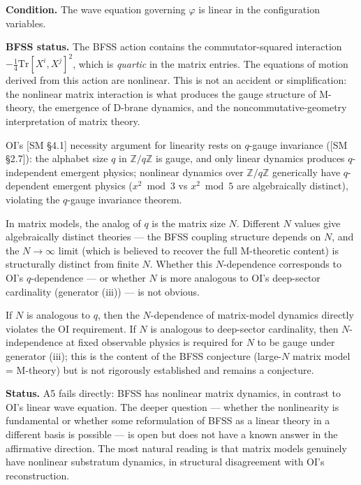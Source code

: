 \documentclass[
]{article}
\begin{document}
\textbf{Condition.} The wave equation governing \(\varphi\) is linear in
the configuration variables.

\textbf{BFSS status.} The BFSS action contains the commutator-squared
interaction \(-\frac{1}{4}\text{Tr}[X^i, X^j]^2\), which is
\emph{quartic} in the matrix entries. The equations of motion derived
from this action are nonlinear. This is not an accident or
simplification: the nonlinear matrix interaction is what produces the
gauge structure of M-theory, the emergence of D-brane dynamics, and the
noncommutative-geometry interpretation of matrix theory.

OI's {[}SM §4.1{]} necessity argument for linearity rests on \(q\)-gauge
invariance ({[}SM §2.7{]}): the alphabet size \(q\) in
\(\mathbb{Z}/q\mathbb{Z}\) is gauge, and only linear dynamics produces
\(q\)-independent emergent physics; nonlinear dynamics over
\(\mathbb{Z}/q\mathbb{Z}\) generically have \(q\)-dependent emergent
physics (\(x^2 \bmod 3\) vs \(x^2 \bmod 5\) are algebraically distinct),
violating the \(q\)-gauge invariance theorem.

In matrix models, the analog of \(q\) is the matrix size \(N\).
Different \(N\) values give algebraically distinct theories --- the BFSS
coupling structure depends on \(N\), and the \(N \to \infty\) limit
(which is believed to recover the full M-theoretic content) is
structurally distinct from finite \(N\). Whether this \(N\)-dependence
corresponds to OI's \(q\)-dependence --- or whether \(N\) is more
analogous to OI's deep-sector cardinality (generator (iii)) --- is not
obvious.

If \(N\) is analogous to \(q\), then the \(N\)-dependence of
matrix-model dynamics directly violates the OI requirement. If \(N\) is
analogous to deep-sector cardinality, then \(N\)-independence at fixed
observable physics is required for \(N\) to be gauge under generator
(iii); this is the content of the BFSS conjecture (large-\(N\) matrix
model = M-theory) but is not rigorously established and remains a
conjecture.

\textbf{Status.} A5 fails directly: BFSS has nonlinear matrix dynamics,
in contrast to OI's linear wave equation. The deeper question ---
whether the nonlinearity is fundamental or whether some reformulation of
BFSS as a linear theory in a different basis is possible --- is open but
does not have a known answer in the affirmative direction. The most
natural reading is that matrix models genuinely have nonlinear
substratum dynamics, in structural disagreement with OI's
reconstruction.
\end{document}
